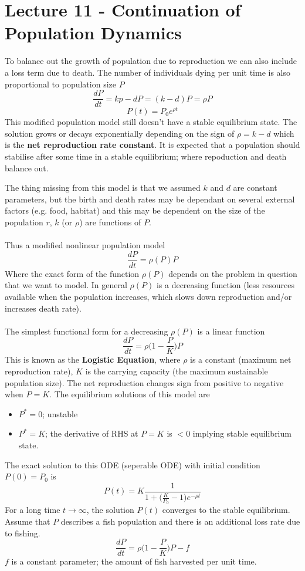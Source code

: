 \documentclass{report}
\theoremstyle{definition}
\theoremstyle{plain}
\theoremstyle{remark}
\begin{document}
\section{Lecture 11 - Continuation of Population Dynamics}
To balance out the growth of population due to reproduction we can also include
a loss term due to death. The number of individuals dying per unit time is also
proportional to population size $ P $
$$ \frac{dP}{dt} = kp - dP = (k-d)P = \rho P$$
$$ P(t) = P_0 e^{\rho t} $$
This modified population model still doesn't have a stable equilibrium state.
The solution grows or decays exponentially depending on the sign of $ \rho
= k - d $ which is the \textbf{net reproduction rate constant}.
It is expected that a population should stabilise after some time in a stable
equilibrium; where repoduction and death balance out.
\par The thing missing from this model is that we assumed $ k $ and $ d $ are
constant parameters, but the birth and death rates may be dependant on several
external factors (e.g. food, habitat) and this may be dependent on the size of
the population $ r $, $ k $ (or $ \rho $) are functions of $ P $. 
\\\\
Thus a modified nonlinear population model
$$ \frac{dP}{dt} = \rho (P) P $$
Where the exact form of the function $ \rho (P) $ depends on the problem in
question that we want to model. In general $ \rho (P) $ is a decreasing
function (less resources available when the population increases, which slows
down reproduction and/or increases death rate).
\\\\
The simplest functional form for a decreasing $ \rho (P) $ is a linear function
$$ \frac{dP}{dt} = \rho \Big (1 - \frac{P}{K} \Big ) P $$
This is known as the \textbf{Logistic Equation}, where $ \rho  $ is a constant
(maximum net reproduction rate), $ K $ is the carrying capacity (the maximum
sustainable population size). The net reproduction changes sign from positive
to negative when $ P = K $. The equilibrium solutions of this model are 
\begin{itemize}
  \item $ P^* = 0 $; unstable
  \item $ P^* = K $; the derivative of RHS at $ P = K $ is $ < 0 $ implying
    stable equilibrium state.
\end{itemize}
The exact solution to this ODE (seperable ODE) with initial condition $ P(0)
= P_0 $ is 
$$ P(t) = K \frac{1}{1+\Big( \frac{K}{P_0} - 1\Big) e^{-\rho t}} $$
For a long time $ t \to \infty $, the solution $ P(t) $ converges to the stable
equilibrium. Assume that $ P $ describes a fish population and there is an
additional loss rate due to fishing.
$$ \frac{dP}{dt} = \rho \Big (1 - \frac{P}{K}\Big ) P - f $$
$ f $ is a constant parameter; the amount of fish harvested per unit time.
\end{document}
